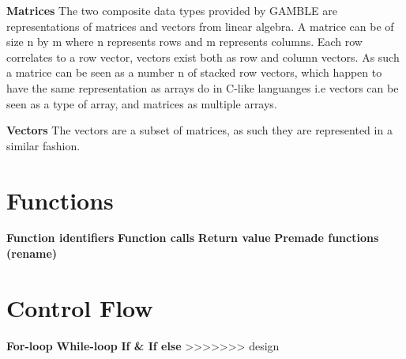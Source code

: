 \textbf{Matrices}
The two composite data types provided by GAMBLE are representations of matrices and vectors from linear algebra.
A matrice can be of size n by m where n represents rows and m represents columns.
Each row correlates to a row vector, vectors exist both as row and column vectors.
As such a matrice can be seen as a number n of stacked row vectors, which happen to have the same representation as arrays do in C-like languanges i.e vectors can be seen as a type of array, and matrices as multiple arrays.

\textbf{Vectors}
The vectors are a subset of matrices, as such they are represented in a similar fashion.

\section{Functions}
\textbf{Function identifiers}
\textbf{Function calls}
\textbf{Return value}
\textbf{Premade functions (rename)}

\section{Control Flow}
\textbf{For-loop}
\textbf{While-loop}
\textbf{If \& If else}
>>>>>>> design

